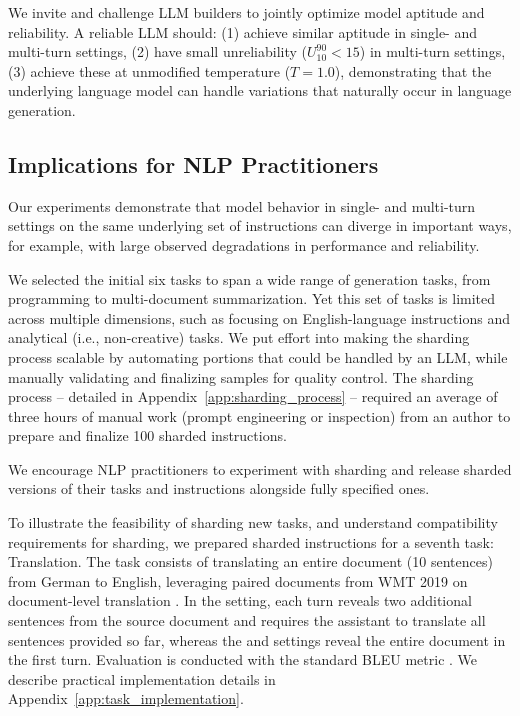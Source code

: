 \documentclass{article}
\begin{document}
We invite and challenge LLM builders to jointly optimize model aptitude and reliability. A reliable LLM should: (1) achieve similar aptitude in single- and multi-turn settings, (2) have small unreliability ($U_{10}^{90} < 15$) in multi-turn settings, (3) achieve these at unmodified temperature ($T=1.0$), demonstrating that the underlying language model can handle variations that naturally occur in language generation.

\subsection{Implications for NLP Practitioners} \label{sec:implications_nlp}

Our experiments demonstrate that model behavior in single- and multi-turn settings on the same underlying set of instructions can diverge in important ways, for example, with large observed degradations in performance and reliability.

We selected the initial six tasks to span a wide range of generation tasks, from programming to multi-document summarization. Yet this set of tasks is limited across multiple dimensions, such as focusing on English-language instructions and analytical (i.e., non-creative) tasks. We put effort into making the sharding process scalable by automating portions that could be handled by an LLM, while manually validating and finalizing samples for quality control. The sharding process -- detailed in Appendix~\ref{app:sharding_process} -- required an average of three hours of manual work (prompt engineering or inspection) from an author to prepare and finalize 100 sharded instructions.

We encourage NLP practitioners to experiment with sharding and release sharded versions of their tasks and instructions alongside fully specified ones.



To illustrate the feasibility of sharding new tasks, and understand compatibility requirements for sharding, we prepared sharded instructions for a seventh task: \translation Translation. The task consists of translating an entire document (10 sentences) from German to English, leveraging paired documents from WMT 2019 on document-level translation \cite{scherrer2019wmt}. In the \shardedt setting, each turn reveals two additional sentences from the source document and requires the assistant to translate all sentences provided so far, whereas the \fullt and \concatt settings reveal the entire document in the first turn. Evaluation is conducted with the standard BLEU metric \cite{papineni2002bleu}. We describe practical implementation details in Appendix~\ref{app:task_implementation}.
\end{document}
